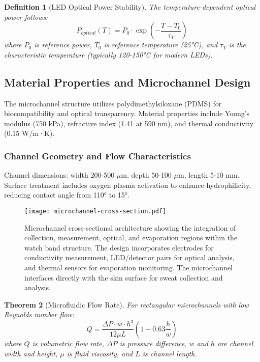 \documentclass[12pt,a4paper]{article}
\newtheorem{theorem}{Theorem}[section]
\newtheorem{definition}[theorem]{Definition}
\begin{document}
\begin{definition}[LED Optical Power Stability]
The temperature-dependent optical power follows:
\begin{equation}
P_{optical}(T) = P_0 \cdot \exp\left(-\frac{T - T_0}{\tau_T}\right)
\end{equation}
where \(P_0\) is reference power, \(T_0\) is reference temperature (25°C), and \(\tau_T\) is the characteristic temperature (typically 120-150°C for modern LEDs).
\end{definition}

\subsection{Material Properties and Microchannel Design}

The microchannel structure utilizes polydimethylsiloxane (PDMS) for biocompatibility and optical transparency. Material properties include Young's modulus (750 kPa), refractive index (1.41 at 590 nm), and thermal conductivity (0.15 W/m·K).

\subsubsection{Channel Geometry and Flow Characteristics}

Channel dimensions: width 200-500 \(\mu\)m, depth 50-100 \(\mu\)m, length 5-10 mm. Surface treatment includes oxygen plasma activation to enhance hydrophilicity, reducing contact angle from 110° to 15°.

\begin{figure}[htbp]
\centering
\texttt{[image: microchannel-cross-section.pdf]}
\caption{Microchannel cross-sectional architecture showing the integration of collection, measurement, optical, and evaporation regions within the watch band structure. The design incorporates electrodes for conductivity measurement, LED/detector pairs for optical analysis, and thermal sensors for evaporation monitoring. The microchannel interfaces directly with the skin surface for sweat collection and analysis.}
\label{fig:microchannel-cross-section}
\end{figure}

\begin{theorem}[Microfluidic Flow Rate]
For rectangular microchannels with low Reynolds number flow:
\begin{equation}
Q = \frac{\Delta P \cdot w \cdot h^3}{12\mu L} \left(1 - 0.63\frac{h}{w}\right)
\end{equation}
where \(Q\) is volumetric flow rate, \(\Delta P\) is pressure difference, \(w\) and \(h\) are channel width and height, \(\mu\) is fluid viscosity, and \(L\) is channel length.
\end{theorem}
\end{document}
